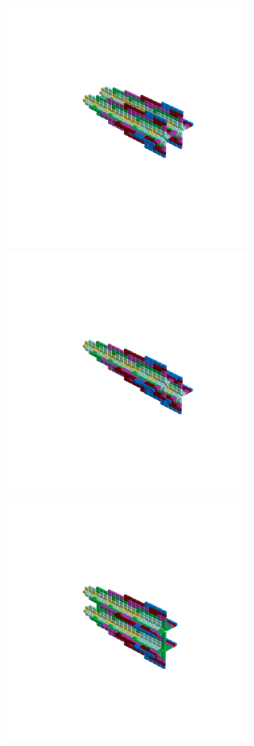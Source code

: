 \begin{minipage}[b]{0.50\linewidth}                                       
  \begin{figure}[H]
      \centering
        \vspace*{-1cm}
        \hspace*{-2cm}
        \includegraphics[width=8cm]{src/symmetries/pattern7_1-45.png}%
        \hspace*{-4cm}
        \includegraphics[width=8cm]{src/symmetries/pattern7_2-45.png}\\
        \vspace*{-5cm}
        \hspace*{-1cm}
        \includegraphics[width=8cm]{src/symmetries/pattern7_3-45.png}\\

\end{figure}
\end{minipage}

